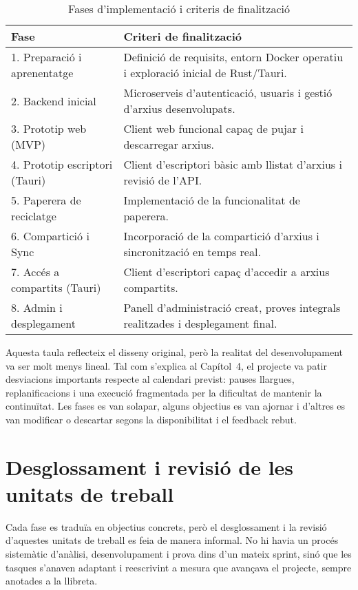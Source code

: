 \begin{table}[h]
  \centering
  \caption{Fases d'implementació i criteris de finalització}
  \label{tab:fases}
  \begin{tabular}{@{}p{3.5cm}p{9cm}@{}}
    \toprule
    \textbf{Fase} & \textbf{Criteri de finalització} \\
    \midrule
    1. Preparació i aprenentatge & Definició de requisits, entorn Docker operatiu i exploració inicial de Rust/Tauri. \\
    2. Backend inicial & Microserveis d'autenticació, usuaris i gestió d'arxius desenvolupats. \\
    3. Prototip web (MVP) & Client web funcional capaç de pujar i descarregar arxius. \\
    4. Prototip escriptori (Tauri) & Client d'escriptori bàsic amb llistat d'arxius i revisió de l'API. \\
    5. Paperera de reciclatge & Implementació de la funcionalitat de paperera. \\
    6. Compartició i Sync & Incorporació de la compartició d'arxius i sincronització en temps real. \\
    7. Accés a compartits (Tauri) & Client d'escriptori capaç d'accedir a arxius compartits. \\
    8. Admin i desplegament & Panell d'administració creat, proves integrals realitzades i desplegament final. \\
    \bottomrule
  \end{tabular}
\end{table}

Aquesta taula reflecteix el disseny original, però la realitat del desenvolupament va ser molt menys lineal. Tal com s'explica al Capítol~4, el projecte va patir desviacions importants respecte al calendari previst: pauses llargues, replanificacions i una execució fragmentada per la dificultat de mantenir la continuïtat. Les fases es van solapar, alguns objectius es van ajornar i d'altres es van modificar o descartar segons la disponibilitat i el feedback rebut.

\section{Desglossament i revisió de les unitats de treball}

Cada fase es traduïa en objectius concrets, però el desglossament i la revisió d'aquestes unitats de treball es feia de manera informal. No hi havia un procés sistemàtic d'anàlisi, desenvolupament i prova dins d'un mateix sprint, sinó que les tasques s'anaven adaptant i reescrivint a mesura que avançava el projecte, sempre anotades a la llibreta.


